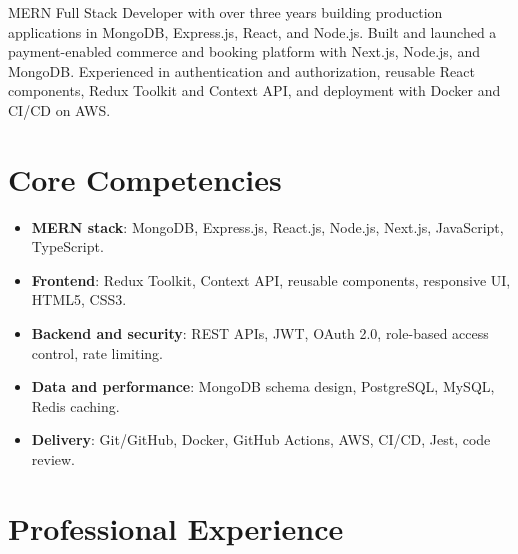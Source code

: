 \documentclass[11pt,a4paper,sans]{moderncv}
\begin{document}
\makecvtitle

\vspace{6pt}
{\small MERN Full Stack Developer with over three years building production applications in MongoDB, Express.js, React, and Node.js. Built and launched a payment-enabled commerce and booking platform with Next.js, Node.js, and MongoDB. Experienced in authentication and authorization, reusable React components, Redux Toolkit and Context API, and deployment with Docker and CI/CD on AWS.\par}

\section{Core Competencies}
\vspace{1pt}
\begin{itemize}

\item \textbf{MERN stack}: MongoDB, Express.js, React.js, Node.js, Next.js, JavaScript, TypeScript.

\item \textbf{Frontend}: Redux Toolkit, Context API, reusable components, responsive UI, HTML5, CSS3.

\item \textbf{Backend and security}: REST APIs, JWT, OAuth 2.0, role-based access control, rate limiting.

\item \textbf{Data and performance}: MongoDB schema design, PostgreSQL, MySQL, Redis caching.

\item \textbf{Delivery}: Git/GitHub, Docker, GitHub Actions, AWS, CI/CD, Jest, code review.

\end{itemize}

\section{Professional Experience}
\vspace{3pt}
\end{document}
